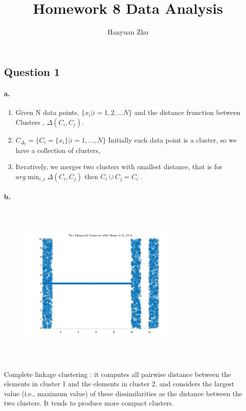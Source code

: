 \documentclass{article}
\title{Homework 8 Data Analysis}
\author{Hanyuan Zhu}
\begin{document}
\maketitle
\subsection*{Question 1}
\paragraph{a.}

\begin{enumerate}
  \item Given N data points, $\{x_i | i = 1,2,...N\} $ and the distance frunction between Clusters , $ \Delta(C_i,C_j)$.
  \item $ C_{\Delta_t} = \{ C_i = \{x_i\} |  i = 1,...,N \}$ Initially each data point is a cluster, so we have a collection of clusters,
  \item  Iteratively, we merges two clusters with smallest distance, that is for $arg\min_{i,j} \Delta(C_i,C_j)$ then $ C_i \cup C_j = C_i $ .
\end{enumerate}

\paragraph{b.}

\begin{figure}[h]
\includegraphics[width=8cm, height=8cm]{4a}
\end{figure}

Complete linkage clustering : it computes all pairwise distance between the elements in cluster 1 and the elements in cluster 2, and considers the largest value (i.e., maximum value) of these dissimilarities as the distance between the two clusters.
It tends to produce more compact clusters.
\end{document}
